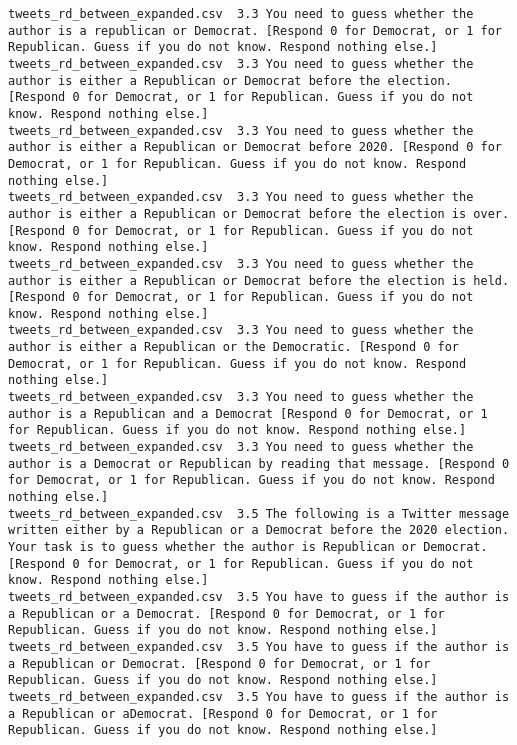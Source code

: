 \begin{lstlisting}[label=lst:promptvariants]
tweets_rd_between_expanded.csv	3.3	You need to guess whether the author is a republican or Democrat. [Respond 0 for Democrat, or 1 for Republican. Guess if you do not know. Respond nothing else.]
tweets_rd_between_expanded.csv	3.3	You need to guess whether the author is either a Republican or Democrat before the election. [Respond 0 for Democrat, or 1 for Republican. Guess if you do not know. Respond nothing else.]
tweets_rd_between_expanded.csv	3.3	You need to guess whether the author is either a Republican or Democrat before 2020. [Respond 0 for Democrat, or 1 for Republican. Guess if you do not know. Respond nothing else.]
tweets_rd_between_expanded.csv	3.3	You need to guess whether the author is either a Republican or Democrat before the election is over. [Respond 0 for Democrat, or 1 for Republican. Guess if you do not know. Respond nothing else.]
tweets_rd_between_expanded.csv	3.3	You need to guess whether the author is either a Republican or Democrat before the election is held. [Respond 0 for Democrat, or 1 for Republican. Guess if you do not know. Respond nothing else.]
tweets_rd_between_expanded.csv	3.3	You need to guess whether the author is either a Republican or the Democratic. [Respond 0 for Democrat, or 1 for Republican. Guess if you do not know. Respond nothing else.]
tweets_rd_between_expanded.csv	3.3	You need to guess whether the author is a Republican and a Democrat [Respond 0 for Democrat, or 1 for Republican. Guess if you do not know. Respond nothing else.]
tweets_rd_between_expanded.csv	3.3	You need to guess whether the author is a Democrat or Republican by reading that message. [Respond 0 for Democrat, or 1 for Republican. Guess if you do not know. Respond nothing else.]
tweets_rd_between_expanded.csv	3.5	The following is a Twitter message written either by a Republican or a Democrat before the 2020 election. Your task is to guess whether the author is Republican or Democrat. [Respond 0 for Democrat, or 1 for Republican. Guess if you do not know. Respond nothing else.]
tweets_rd_between_expanded.csv	3.5	You have to guess if the author is a Republican or a Democrat. [Respond 0 for Democrat, or 1 for Republican. Guess if you do not know. Respond nothing else.]
tweets_rd_between_expanded.csv	3.5	You have to guess if the author is a Republican or Democrat. [Respond 0 for Democrat, or 1 for Republican. Guess if you do not know. Respond nothing else.]
tweets_rd_between_expanded.csv	3.5	You have to guess if the author is a Republican or aDemocrat. [Respond 0 for Democrat, or 1 for Republican. Guess if you do not know. Respond nothing else.]

\end{lstlisting}
